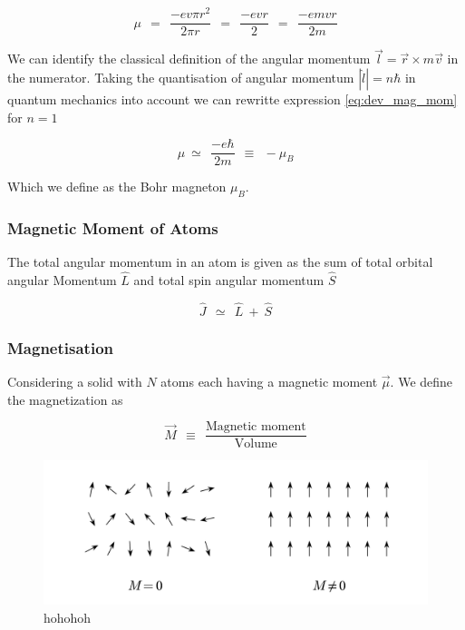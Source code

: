 \documentclass[10pt]{report}
\numberwithin{equation}{chapter}
\begin{document}
\begin{equation} \label{eq:dev_mag_mom}
  \mu ~~=~~ \frac{-e v \pi r^2}{2 \pi r} ~~=~~ \frac{-evr}{2} ~~=~~ \frac{-e m v r}{2m}
\end{equation}

We can identify the classical definition of the angular momentum  $\vec{l} = \vec{r} \times m \vec{v}$ in the numerator. Taking the quantisation of angular momentum $|\hat{l}| = n \hbar$ in quantum mechanics into account we can rewritte expression \ref{eq:dev_mag_mom} for $n=1$

\begin{equation} \label{eq:bohr_mag}
  \mu ~≃ ~~ \frac{-e \hbar}{2m} ~~ \equiv ~~ -\mu_B
\end{equation}

Which we define as the Bohr magneton $\mu_B$.


\subsubsection{Magnetic Moment of Atoms}

The total angular momentum in an atom is given as the sum of total orbital angular Momentum $\hat{L}$  and total spin angular momentum $\hat{S}$

\begin{equation}
  \hat{J} ~~≃~~ \hat{L} ~+~ \hat{S}
\end{equation}

\subsubsection{Magnetisation}

Considering a solid with $N$ atoms each having a magnetic moment $\vec{\mu}$. We define the magnetization as 

\begin{equation}
  \vec{M} ~~\equiv~~ \frac{\text{Magnetic moment}}{\text{Volume}}
\end{equation}

\begin{figure}
  \centering
  \includegraphics[width=0.8\linewidth]{../img/mag_in_solid.pdf}
  \caption{hohohoh}
\end{figure}
\end{document}
